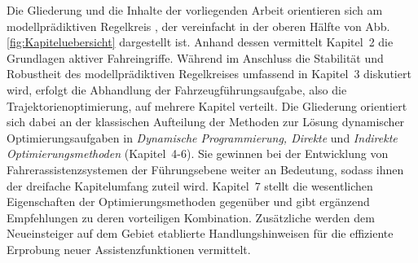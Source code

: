 Die Gliederung und die Inhalte der vorliegenden Arbeit orientieren sich am modellprädiktiven Regelkreis \cite{Lewis_OC}, der vereinfacht in der oberen Hälfte von Abb.\,\ref{fig:Kapiteluebersicht} dargestellt ist. Anhand dessen vermittelt Kapitel~2 die Grundlagen aktiver Fahreingriffe. Während im Anschluss die Stabilität und Robustheit des modellprädiktiven Regelkreises umfassend in Kapitel~3 diskutiert wird, erfolgt die Abhandlung der Fahrzeugführungsaufgabe, also die Trajektorienoptimierung, auf mehrere Kapitel verteilt. Die Gliederung orientiert sich dabei an der klassischen Aufteilung der Methoden zur Lösung dynamischer Optimierungsaufgaben in \emph{Dynamische Programmierung, Direkte} und \emph{Indirekte Optimierungsmethoden} (Kapitel~4-6). 
Sie gewinnen bei der Entwicklung von Fahrerassistenzsystemen der Führungsebene weiter an Bedeutung, sodass ihnen der dreifache Kapitelumfang zuteil wird. %
Kapitel~7 stellt die wesentlichen Eigenschaften der Optimierungsmethoden gegenüber und gibt ergänzend Empfehlungen zu deren vorteiligen Kombination. Zusätzliche werden dem Neueinsteiger auf dem Gebiet etablierte Handlungshinweisen für die effiziente Erprobung neuer Assistenzfunktionen vermittelt.


